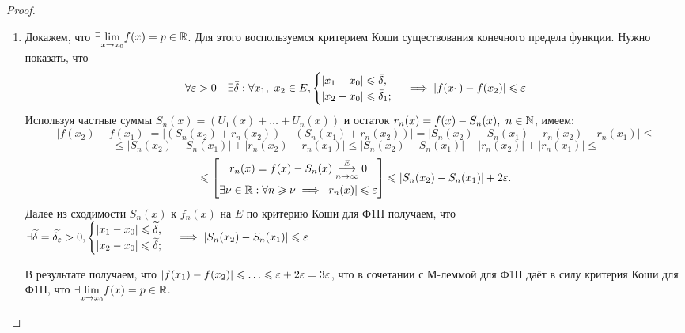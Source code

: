 \documentclass[../../main.tex]{subfiles}
\begin{document}
\begin{proof}
	\;
	
	\begin{enumerate}
		\item Докажем, что $\exists \underset{x \to x_0}{\lim} f(x) = 
	p \in \mathbb{R}$. Для этого воспользуемся критерием Коши существования 
	конечного предела функции. Нужно показать, что
	\begin{equation}
	\label{lec2:17}
	\forall \varepsilon > 0 \quad \exists \bar\delta :
	\forall x_1,\ x_2 \in E, 
	\begin{cases}
	|x_1 - x_0| \leqslant \bar\delta, \\
	|x_2 - x_0| \leqslant \bar\delta_1;
	\end{cases} \implies
	|f(x_1) - f(x_2)| \leqslant \varepsilon
	\end{equation}
	Используя частные суммы $S_n(x) = (U_1(x) + \ldots + U_n(x))$ и 
	остаток $r_n(x) = f(x) - S_n(x),\ n \in \mathbb{N}$, имеем:
	\[
	|f(x_2) - f(x_1)| = |(S_n(x_2) + r_n(x_2)) - (S_n(x_1) + r_n(x_2))| =
	|S_n(x_2) - S_n(x_1) + r_n(x_2) - r_n(x_1)| \leq 
	\]
	\[
	\leq |S_n(x_2) - S_n(x_1)| + |r_n(x_2) - r_n(x_1)| \leq 
	|S_n(x_2) - S_n(x_1)| + |r_n(x_2)| + |r_n(x_1)| \leq
	\]
	\[
	\leqslant 
	\left[
	\begin{gathered}
	r_n(x) = f(x) - S_n(x) \overset{E}
	{\underset{n \to \infty}\longrightarrow} 0 \\
	\exists \nu \in \mathbb{R} : \forall n \geqslant \nu \implies
	|r_n(x)| \leqslant \varepsilon
	\end{gathered}
	\right] \leqslant |S_n(x_2) - S_n(x_1)| + 2\varepsilon.
	\]
	Далее из сходимости $S_n(x)$ к $f_n(x)$ на $E$ по критерию Коши для Ф1П
	получаем, что $\exists \widetilde{\delta} = \widetilde{\delta_\varepsilon} > 0,
	\begin{cases} 
	|x_1 - x_0| \leqslant \widetilde{\delta}, \\
	|x_2 - x_0| \leqslant \widetilde{\delta};
	\end{cases} \implies
	|S_n(x_2) - S_n(x_1)| \leqslant \varepsilon$ 
	
	В результате получаем, что $|f(x_1) - f(x_2)| \leqslant \ldots \leqslant 
	\varepsilon + 2\varepsilon = 3\varepsilon$, что в сочетании с М-леммой для Ф1П даёт
	в силу критерия Коши для Ф1П, что $\exists \underset{x \to x_0}{\lim}
	f(x) = p \in \mathbb{R}$.
	\end{enumerate}
\end{proof}
	
\end{document}
